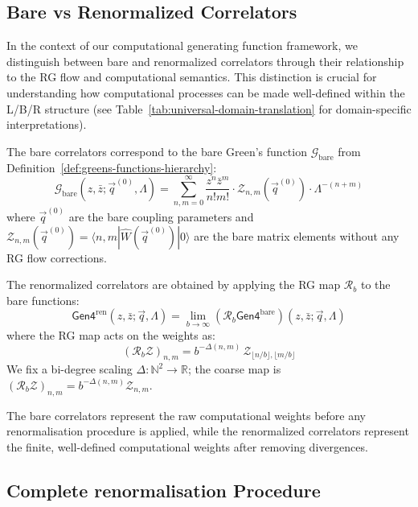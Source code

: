 \subsection{Bare vs Renormalized Correlators}

In the context of our computational generating function framework, we distinguish between bare and renormalized correlators through their relationship to the RG flow and computational semantics. This distinction is crucial for understanding how computational processes can be made well-defined within the L/B/R structure (see Table~\ref{tab:universal-domain-translation} for domain-specific interpretations).

\begin{definition}
\label{def:bare-correlators}
The bare correlators correspond to the bare Green's function $\mathcal{G}_{\text{bare}}$ from Definition~\ref{def:greens-functions-hierarchy}:
\[
\mathcal{G}_{\text{bare}}(z, \bar{z}; \vec{q}^{(0)}, \Lambda) = \sum_{n,m=0}^{\infty} \frac{z^n \bar{z}^m}{n! m!} \cdot \mathcal{Z}_{n,m}(\vec{q}^{(0)}) \cdot \Lambda^{-(n+m)}
\]
where $\vec{q}^{(0)}$ are the bare coupling parameters and $\mathcal{Z}_{n,m}(\vec{q}^{(0)}) = \langle n,m|\hat{W}(\vec{q}^{(0)})|0\rangle$ are the bare matrix elements without any RG flow corrections.
\end{definition}

\begin{definition}
\label{def:renormalized-greens}
The renormalized correlators are obtained by applying the RG map $\mathcal{R}_b$ to the bare functions:
\[
\mathsf{Gen4}^{\text{ren}}(z, \bar{z}; \vec{q}, \Lambda) = \lim_{b \to \infty} (\mathcal{R}_b \mathsf{Gen4}^{\text{bare}})(z, \bar{z}; \vec{q}, \Lambda)
\]
where the RG map acts on the weights as:
\[
(\mathcal{R}_b\mathcal{Z})_{n,m} = b^{-\Delta(n,m)}\,\mathcal{Z}_{\lfloor n/b\rfloor,\lfloor m/b\rfloor}
\]
We fix a bi-degree scaling $\Delta:\mathbb{N}^2\to\mathbb{R}$; the coarse map is $(\mathcal{R}_b\mathcal{Z})_{n,m}=b^{-\Delta(n,m)}\mathcal{Z}_{n,m}$.
\end{definition}

The bare correlators represent the raw computational weights before any renormalisation procedure is applied, while the renormalized correlators represent the finite, well-defined computational weights after removing divergences.

\subsection{Complete renormalisation Procedure}

